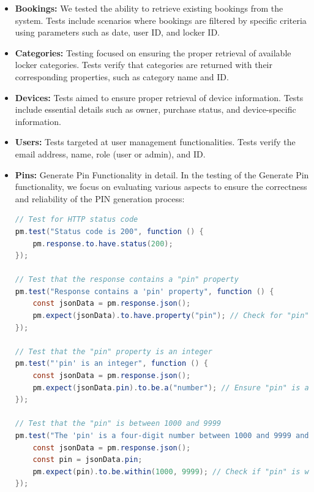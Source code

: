 \begin{itemize}
    \item \textbf{Bookings:} We tested the ability to retrieve existing bookings from the system. Tests include scenarios where bookings are filtered by specific criteria using parameters such as date, user ID, and locker ID.

    \item \textbf{Categories:} Testing focused on ensuring the proper retrieval of available locker categories. Tests verify that categories are returned with their corresponding properties, such as category name and ID.

    \item \textbf{Devices:} Tests aimed to ensure proper retrieval of device information. Tests include essential details such as owner, purchase status, and device-specific information.

    \item \textbf{Users:} Tests targeted at user management functionalities. Tests verify the email address, name, role (user or admin), and ID.

    \item \textbf{Pins:} Generate Pin Functionality in detail. In the testing of the Generate Pin functionality, we focus on evaluating various aspects to ensure the correctness and reliability of the PIN generation process:
    \begin{lstlisting}[language=Java]
    // Test for HTTP status code
pm.test("Status code is 200", function () {
    pm.response.to.have.status(200);
});

// Test that the response contains a "pin" property
pm.test("Response contains a 'pin' property", function () {
    const jsonData = pm.response.json();
    pm.expect(jsonData).to.have.property("pin"); // Check for "pin" property
});

// Test that the "pin" property is an integer
pm.test("'pin' is an integer", function () {
    const jsonData = pm.response.json();
    pm.expect(jsonData.pin).to.be.a("number"); // Ensure "pin" is a number
});

// Test that the "pin" is between 1000 and 9999
pm.test("The 'pin' is a four-digit number between 1000 and 9999 and the generated 'pin' is unique", function () {
    const jsonData = pm.response.json();
    const pin = jsonData.pin;
    pm.expect(pin).to.be.within(1000, 9999); // Check if "pin" is within the four-digit range
});
\end{lstlisting}


\end{itemize}
